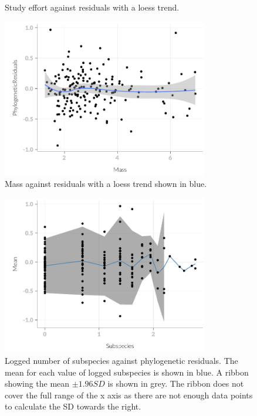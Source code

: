 \begin{knitrout}
\begin{figure}[t]
{}

\caption[Study effort against residuals with a loess trend]{Study effort against residuals with a loess trend.}\label{fig:subsAnalysis}
\end{figure}

\begin{figure}[t]

{\centering \includegraphics[width=0.8\textwidth]{figure/subsAnalysis-3} 

}

\caption[Mass against residuals with a loess trend shown in blue]{Mass against residuals with a loess trend shown in blue.}\label{fig:subsAnalysis}
\end{figure}

\begin{figure}[t]

{\centering \includegraphics[width=0.8\textwidth]{figure/subsAnalysis-4} 

}

\caption[Logged number of subspecies against phylogenetic residuals]{Logged number of subspecies against phylogenetic residuals. The mean for each value of logged subspecies is shown in blue. A ribbon showing the mean $\pm 1.96{SD}$ is shown in grey. The ribbon does not cover the full range of the x axis as there are not enough data points to calculate the SD towards the right.}\label{fig:subsAnalysis}
\end{figure}


\end{knitrout}
